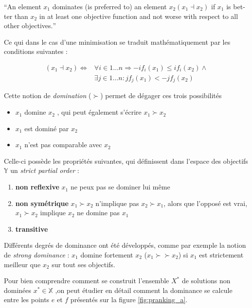 \foreignquote{english}{An element $x_1$ dominates (is preferred to) an element $x_2 (x_1 \dashv x_2)$ if $x_1$ is better than $x_2$ in at least one objective function and not worse with respect to all other objectives.}

Ce qui dans le cas d'une minimisation se traduit mathématiquement par les conditions suivantes :

\begin{align*}
	(x_1 \dashv x_2) \Leftrightarrow &\forall i \in 1 \dotsc n \Rightarrow - i f_i (x_1) \leq i f_i (x_2) \land \\
	&\exists j \in 1 \dotsc n : j f_j (x_1) < - j f_j (x_2)
\end{align*}

Cette notion de \textit{domination} ($\succ$)  permet de dégager ces trois possibilités

\begin{itemize}
\item $x_1$ domine $x_2$ , qui peut également s'écrire $x_1 \succ x_2$
\item $x_1$ est dominé par $x_2$
\item $x_1$ n'est pas comparable avec $x_2$
\end{itemize}

Celle-ci possède les propriétés suivantes, qui définissent dans l'espace des objectifs $\mathbb{Y}$ un \textit{strict partial order} :

\begin{enumerate}
\item{\textbf{non reflexive}}  $x_1$ ne peux pas se dominer lui même
\item{\textbf{non symétrique}} $ x_1 \succ x_2$ n'implique pas $x_2 \succ x_1$, alors que l'opposé est vrai, $x_1 \succ x_2$ implique $x_2$ ne domine pas $x_1$
\item{\textbf{transitive} }
\end{enumerate}

Différents degrés de dominance ont été développés, comme par exemple la notion de \textit{strong dominance} : $x_1$ domine fortement $x_2$ ($x_1 \succ \succ x_2$) si $x_1$ est strictement meilleur que $x_2$ sur tout ses objectifs.

Pour bien comprendre comment se construit l'ensemble $X^*$ de solutions non dominées $x^* \in \mathbb{X}$ ,on peut étudier en détail comment la dominance se calcule entre les points $e$ et $f$ présentés sur la figure \ref{fig:pranking_a}.

